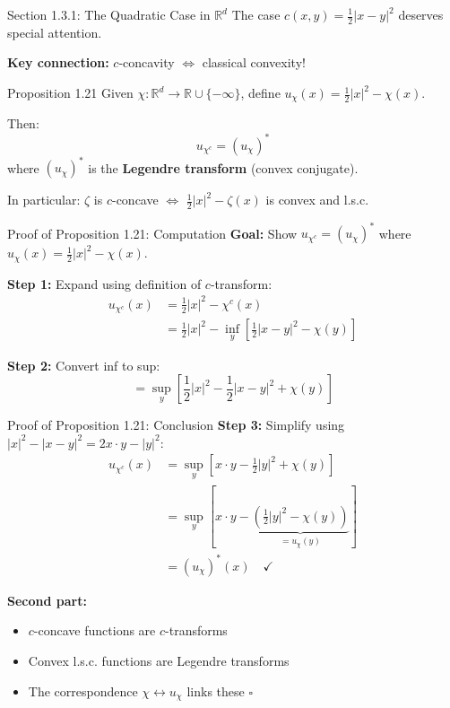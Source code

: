 \documentclass[aspectratio=169]{beamer}
\newcommand{\R}{\mathbb{R}}
\begin{document}
\begin{frame}{Section 1.3.1: The Quadratic Case in $\R^d$}
The case $c(x,y) = \frac{1}{2}|x-y|^2$ deserves special attention.

\vspace{0.3cm}
\textbf{Key connection:} $c$-concavity $\Leftrightarrow$ classical convexity!

\vspace{0.3cm}
\begin{block}{Proposition 1.21}
Given $\chi: \R^d \to \R \cup \{-\infty\}$, define $u_\chi(x) = \frac{1}{2}|x|^2 - \chi(x)$.

Then:
\[
\boxed{u_{\chi^c} = (u_\chi)^*}
\]
where $(u_\chi)^*$ is the \textbf{Legendre transform} (convex conjugate).

\vspace{0.2cm}
In particular: $\zeta$ is $c$-concave $\Leftrightarrow$ $\frac{1}{2}|x|^2 - \zeta(x)$ is convex and l.s.c.
\end{block}
\end{frame}

\begin{frame}{Proof of Proposition 1.21: Computation}
\textbf{Goal:} Show $u_{\chi^c} = (u_\chi)^*$ where $u_\chi(x) = \frac{1}{2}|x|^2 - \chi(x)$.

\vspace{0.3cm}
\textbf{Step 1:} Expand using definition of $c$-transform:
\begin{align*}
u_{\chi^c}(x) &= \frac{1}{2}|x|^2 - \chi^c(x) \\
&= \frac{1}{2}|x|^2 - \inf_y \left[\frac{1}{2}|x-y|^2 - \chi(y)\right]
\end{align*}

\vspace{0.2cm}
\textbf{Step 2:} Convert inf to sup:
\[
= \sup_y \left[\frac{1}{2}|x|^2 - \frac{1}{2}|x-y|^2 + \chi(y)\right]
\]
\end{frame}

\begin{frame}{Proof of Proposition 1.21: Conclusion}
\textbf{Step 3:} Simplify using $|x|^2 - |x-y|^2 = 2x \cdot y - |y|^2$:
\begin{align*}
u_{\chi^c}(x) &= \sup_y \left[x \cdot y - \frac{1}{2}|y|^2 + \chi(y)\right] \\
&= \sup_y \left[x \cdot y - \underbrace{\left(\frac{1}{2}|y|^2 - \chi(y)\right)}_{= u_\chi(y)}\right] \\
&= (u_\chi)^*(x) \quad \checkmark
\end{align*}

\vspace{0.3cm}
\textbf{Second part:}
\begin{itemize}
    \item $c$-concave functions are $c$-transforms
    \item Convex l.s.c. functions are Legendre transforms
    \item The correspondence $\chi \leftrightarrow u_\chi$ links these \hfill $\square$
\end{itemize}
\end{frame}
\end{document}
